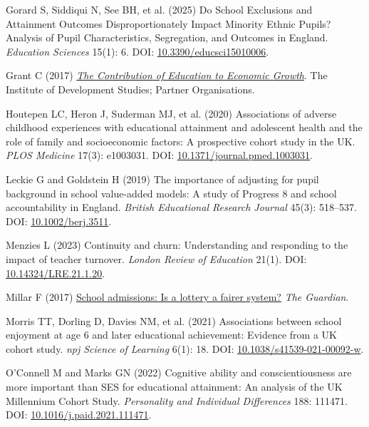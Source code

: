 \documentclass[
  11pt,
]{article}
\newlength{\cslhangindent}
\newenvironment{CSLReferences}[2] %
 {\begin{list}{}{%
  \setlength{\itemindent}{0pt}
  \setlength{\leftmargin}{0pt}
  \setlength{\parsep}{0pt}
  \ifodd #1
   \setlength{\leftmargin}{\cslhangindent}
   \setlength{\itemindent}{-1\cslhangindent}
  \fi
  \setlength{\itemsep}{#2\baselineskip}}}
 {\end{list}}
\begin{document}
\begin{CSLReferences}{1}{1}
Gorard S, Siddiqui N, See BH, et al. (2025) Do {School} {Exclusions} and
{Attainment} {Outcomes} {Disproportionately} {Impact} {Minority}
{Ethnic} {Pupils}? {Analysis} of {Pupil} {Characteristics},
{Segregation}, and {Outcomes} in {England}. \emph{Education Sciences}
15(1): 6. DOI:
\href{https://doi.org/10.3390/educsci15010006}{10.3390/educsci15010006}.

Grant C (2017)
\emph{\href{https://opendocs.ids.ac.uk/articles/report/The_Contribution_of_Education_to_Economic_Growth/26453986/1}{The
{Contribution} of {Education} to {Economic} {Growth}}}. The Institute of
Development Studies; Partner Organisations.

Houtepen LC, Heron J, Suderman MJ, et al. (2020) Associations of adverse
childhood experiences with educational attainment and adolescent health
and the role of family and socioeconomic factors: {A} prospective cohort
study in the {UK}. \emph{PLOS Medicine} 17(3): e1003031. DOI:
\href{https://doi.org/10.1371/journal.pmed.1003031}{10.1371/journal.pmed.1003031}.

Leckie G and Goldstein H (2019) The importance of adjusting for pupil
background in school value-added models: {A} study of {Progress} 8 and
school accountability in {England}. \emph{British Educational Research
Journal} 45(3): 518--537. DOI:
\href{https://doi.org/10.1002/berj.3511}{10.1002/berj.3511}.

Menzies L (2023) Continuity and churn: Understanding and responding to
the impact of teacher turnover. \emph{London Review of Education} 21(1).
DOI: \href{https://doi.org/10.14324/LRE.21.1.20}{10.14324/LRE.21.1.20}.

Millar F (2017)
\href{https://www.theguardian.com/education/2017/mar/14/school-admissions-lottery-system-brighton}{School
admissions: Is a lottery a fairer system?} \emph{The Guardian}.

Morris TT, Dorling D, Davies NM, et al. (2021) Associations between
school enjoyment at age 6 and later educational achievement: Evidence
from a {UK} cohort study. \emph{npj Science of Learning} 6(1): 18. DOI:
\href{https://doi.org/10.1038/s41539-021-00092-w}{10.1038/s41539-021-00092-w}.

O'Connell M and Marks GN (2022) Cognitive ability and conscientiousness
are more important than {SES} for educational attainment: {An} analysis
of the {UK} {Millennium} {Cohort} {Study}. \emph{Personality and
Individual Differences} 188: 111471. DOI:
\href{https://doi.org/10.1016/j.paid.2021.111471}{10.1016/j.paid.2021.111471}.


\end{CSLReferences}
\end{document}
